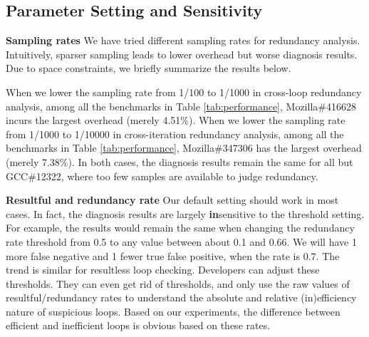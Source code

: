 \subsection{Parameter Setting and Sensitivity}
\label{sec:sensi}
\noindent\textbf{Sampling rates}
We have tried different sampling rates for redundancy analysis.
Intuitively, sparser sampling leads to lower overhead but worse diagnosis
results. Due to space constraints, we briefly summarize the results below.

When we lower the sampling rate from 1/100 to 1/1000 
in cross-loop redundancy analysis,
among all the benchmarks in Table \ref{tab:performance},
Mozilla\#416628 incurs the largest overhead (merely 4.51\%). 
When we lower the sampling rate from 1/1000 to 1/10000
in cross-iteration redundancy analysis,
among all the benchmarks in Table \ref{tab:performance},
Mozilla\#347306 has the largest overhead (merely 7.38\%). 
In both cases,
the diagnosis results remain 
the same for all but GCC\#12322, where too few samples are available
to judge redundancy.

\noindent\textbf{Resultful and redundancy rate}
Our default setting should work in most cases.
In fact, the diagnosis results are largely {\bf in}sensitive to the threshold
setting. For example, the results would remain the same when
changing the redundancy rate threshold from 0.5 to any value between about
0.1 and 0.66. We will have 1 more false negative and 1 fewer true false positive, 
when the rate is 0.7. The trend is similar for resultless loop checking. 
Developers can adjust these thresholds. 
They can even get rid of thresholds, and only
use the raw values of resultful/redundancy rates to understand
the absolute and relative (in)efficiency nature of suspicious 
loops. Based on our experiments, the difference between efficient and inefficient
loops is obvious based on these rates.


